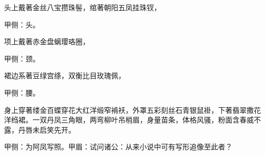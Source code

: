 \begin{qute2sp}
    头上戴著金丝八宝攒珠髻，绾著朝阳五凤挂珠钗，\begin{note}甲侧：头。\end{note}项上戴著赤金盘螭璎珞圈，\begin{note}甲侧：颈。\end{note}裙边系著豆绿宫绦，双衡比目玫瑰佩，\begin{note}甲侧：腰。\end{note}身上穿著缕金百蝶穿花大红洋缎窄褃袄，外罩五彩刻丝石青银鼠褂，下著翡翠撒花洋绉裙。一双丹凤三角眼，两弯柳叶吊梢眉，身量苗条，体格风骚，粉面含春威不露，丹唇未启笑先开。\begin{note}甲侧：为阿凤写照。甲眉：试问诸公：从来小说中可有写形追像至此者？\end{note}
\end{qute2sp}

